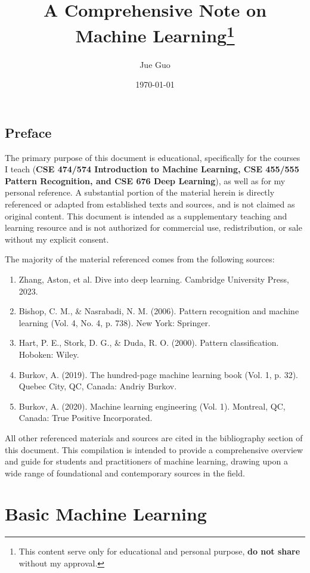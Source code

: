 \documentclass[12pt]{book}
\title{A Comprehensive Note on Machine Learning\footnote{This content serve only for educational and personal purpose, \textbf{do not share} without my approval.}}
\author{Jue Guo}
\date{\today}
\begin{document}
\frontmatter
\maketitle
\tableofcontents
\chapter*{Preface}

The primary purpose of this document is educational, specifically for the courses I teach (\textbf{CSE 474/574 Introduction to Machine Learning, CSE 455/555 Pattern Recognition, and CSE 676 Deep Learning}), as well as for my personal reference. A substantial portion of the material herein is directly referenced or adapted from established texts and sources, and is not claimed as original content. This document is intended as a supplementary teaching and learning resource and is not authorized for commercial use, redistribution, or sale without my explicit consent.

The majority of the material referenced comes from the following sources:

{
\renewcommand{\labelenumi}{[\theenumi]}
\setcounter{enumi}{0} %

\begin{enumerate}
	\item Zhang, Aston, et al. Dive into deep learning. Cambridge University Press, 2023.
	\item Bishop, C. M., \& Nasrabadi, N. M. (2006). Pattern recognition and machine learning (Vol. 4, No. 4, p. 738). New York: Springer.
	\item Hart, P. E., Stork, D. G., \& Duda, R. O. (2000). Pattern classification. Hoboken: Wiley.
	\item Burkov, A. (2019). The hundred-page machine learning book (Vol. 1, p. 32). Quebec City, QC, Canada: Andriy Burkov.
	\item Burkov, A. (2020). Machine learning engineering (Vol. 1). Montreal, QC, Canada: True Positive Incorporated.
\end{enumerate}
}

All other referenced materials and sources are cited in the bibliography section of this document. This compilation is intended to provide a comprehensive overview and guide for students and practitioners of machine learning, drawing upon a wide range of foundational and contemporary sources in the field.

\mainmatter
\part{Basic Machine Learning}


\end{document}
